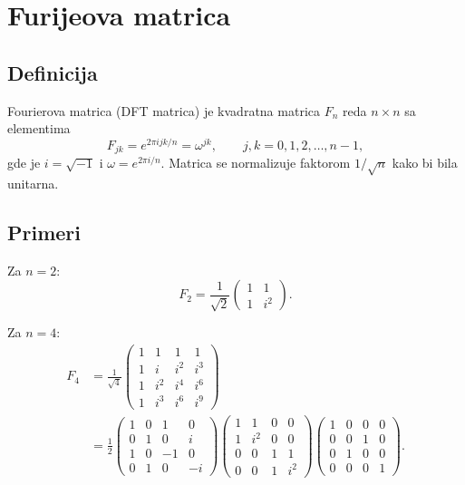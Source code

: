 \documentclass[12pt,a4paper]{report}
\begin{document}
\section{Furijeova matrica}

\subsection{Definicija}

Fourierova matrica (DFT matrica) je kvadratna matrica $F_n$ reda $n \times n$
sa elementima
\begin{equation}
	F_{jk} = e^{2\pi i jk/n} = \omega^{jk}, \qquad j,k = 0,1,2,\dots,n-1,
\end{equation}
gde je $i=\sqrt{-1}$ i $\omega = e^{2\pi i/n}$. Matrica se normalizuje
faktorom $1/\sqrt{n}$ kako bi bila unitarna.

\subsection{Primeri}

Za $n=2$:
\begin{equation}
	F_2 = \frac{1}{\sqrt{2}}
	\begin{pmatrix}
		1 & 1 \\
		1 & i^2
	\end{pmatrix}.
\end{equation}

Za $n=4$:
\begin{align}
	F_4 &= \frac{1}{\sqrt{4}}
	\begin{pmatrix}
		1 & 1   & 1   & 1   \\
		1 & i   & i^2 & i^3 \\
		1 & i^2 & i^4 & i^6 \\
		1 & i^3 & i^6 & i^9
	\end{pmatrix} \\[1ex]
	&= \frac{1}{2}
	\begin{pmatrix}
		1 & 0 & 1  & 0  \\
		0 & 1 & 0  & i  \\
		1 & 0 & -1 & 0  \\
		0 & 1 & 0  & -i
	\end{pmatrix}
	\begin{pmatrix}
		1 & 1   & 0 & 0   \\
		1 & i^2 & 0 & 0   \\
		0 & 0   & 1 & 1   \\
		0 & 0   & 1 & i^2
	\end{pmatrix}
	\begin{pmatrix}
		1 & 0 & 0 & 0 \\
		0 & 0 & 1 & 0 \\
		0 & 1 & 0 & 0 \\
		0 & 0 & 0 & 1
	\end{pmatrix}.
\end{align}
\end{document}
